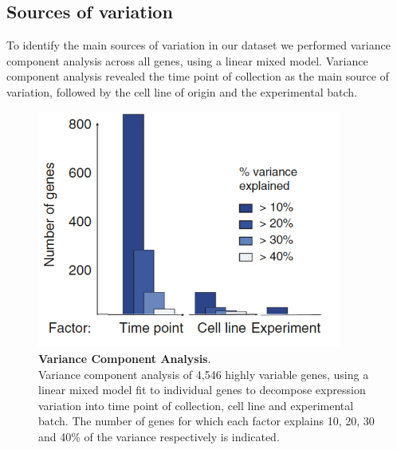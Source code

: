 \newpage

\subsection{Sources of variation} 


To identify the main sources of variation in our dataset we performed variance component analysis across all genes, using a linear mixed model.
Variance component analysis revealed the time point of collection as the main source of variation, followed by the cell line of origin and the experimental batch.\\

\begin{figure}[h]
\includegraphics[width=10cm]{Chapter4/Fig/endodiff_variance_component.png}
\caption[Variance Component Analysis]{\textbf{Variance Component Analysis}.\\
Variance component analysis of 4,546 highly variable genes, using a linear mixed model fit to individual genes to decompose expression variation into
time point of collection, cell line and experimental batch.
The number of genes for which each factor explains 10, 20, 30 and 40\% of the variance respectively is indicated.}
\end{figure}

